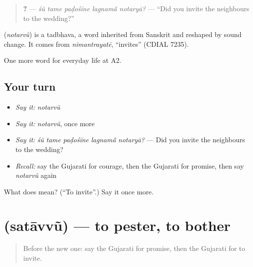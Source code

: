 \begin{quote}
\textbf{    ?} — \emph{śũ tame paḍośīne lagnamā̃ notaryā?} — \textquotedblleft{}Did you invite the neighbours to the wedding?\textquotedblright{}
\end{quote}

\begin{cousinweb}
\textbf{} (\emph{notarvũ}) is a tadbhava, a word inherited from Sanskrit and reshaped by sound change. It comes from \emph{nimantrayatē}, \textquotedblleft{}invites\textquotedblright{} (CDIAL 7235).
\end{cousinweb}

\begin{grammarlens}[title={What you've built}]
One more word for everyday life at A2.
\end{grammarlens}

\subsection*{Your turn}
\begin{itemize}
\raggedright
  \item \emph{Say it:} \emph{notarvũ}
  \item \emph{Say it:} \emph{notarvũ}, once more
  \item \emph{Say it:} \emph{śũ tame paḍośīne lagnamā̃ notaryā?} — Did you invite the neighbours to the wedding?
  \item \emph{Recall:} say the Gujarati for courage, then the Gujarati for promise, then say \emph{notarvũ} again
\end{itemize}

\begin{tcolorbox}[breakable,colback=teal!4,colframe=teal!35!black,title={Before you move on}]
What does  mean? (\textquotedblleft{}To invite\textquotedblright{}.) Say it once more.
\end{tcolorbox}
\section[\texorpdfstring{\gu{સતાવવું} (satāvvũ)}{સતાવવું (satāvvũ)}]{ (satāvvũ) — to pester, to bother}

\label{lesson:GU-C272-satavvu}



\begin{quote}
Before the new one: say the Gujarati for promise, then the Gujarati for to invite.
\end{quote}

